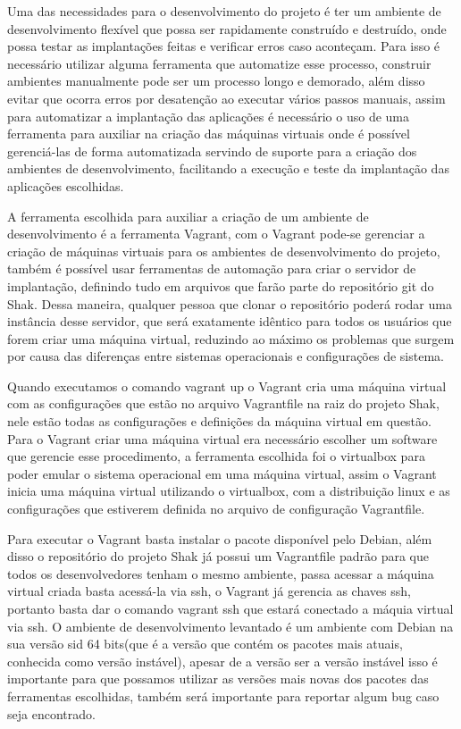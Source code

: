 Uma das necessidades para o desenvolvimento do projeto é ter um ambiente de desenvolvimento
flexível que possa ser rapidamente construído e destruído, onde possa testar as
implantações feitas e verificar erros caso aconteçam. Para isso é necessário utilizar
alguma ferramenta que automatize esse processo, construir ambientes manualmente pode
ser um processo longo e demorado, além disso evitar que ocorra erros por
desatenção ao executar vários passos manuais, assim para automatizar a implantação
das aplicações é necessário o uso de uma ferramenta para auxiliar na criação das
máquinas virtuais onde é possível gerenciá-las de forma automatizada servindo de
suporte para a criação dos ambientes de desenvolvimento, facilitando a execução e teste da implantação das
aplicações escolhidas.

A ferramenta escolhida para auxiliar a criação de um ambiente de desenvolvimento é
a ferramenta Vagrant, com o Vagrant pode-se gerenciar a criação de máquinas
virtuais para os ambientes de desenvolvimento do projeto, também é possível usar
ferramentas de automação para criar o servidor de implantação, definindo tudo
em arquivos que farão parte do repositório git do Shak. Dessa maneira,
qualquer pessoa que clonar o repositório poderá rodar uma instância desse servidor, que será exatamente
idêntico para todos os usuários que forem criar uma máquina virtual, reduzindo ao
máximo os problemas que surgem por causa das diferenças entre sistemas operacionais e configurações de sistema.

Quando executamos o comando vagrant up o Vagrant cria uma máquina virtual com as
configurações que estão no arquivo Vagrantfile na raiz do projeto Shak, nele
estão todas as configurações e definições da máquina virtual em questão. Para o
Vagrant criar uma máquina virtual era necessário escolher um software que gerencie
esse procedimento, a ferramenta escolhida foi o virtualbox para poder emular o sistema
operacional em uma máquina virtual, assim o Vagrant inicia uma máquina virtual
utilizando o virtualbox, com a distribuição linux e as configurações que estiverem
definida no arquivo de configuração Vagrantfile.

Para executar o Vagrant basta instalar o pacote disponível pelo Debian, além disso
o repositório do projeto Shak já possui um Vagrantfile padrão para que todos os
desenvolvedores tenham o mesmo ambiente, passa acessar a máquina virtual criada
basta acessá-la via ssh, o Vagrant já gerencia as chaves ssh, portanto basta
dar o comando vagrant ssh que estará conectado a máquia virtual via ssh.
O ambiente de desenvolvimento levantado é um ambiente com Debian na sua versão
sid 64 bits(que é a versão que contém os pacotes mais atuais, conhecida como versão instável),
apesar de a versão ser a versão instável isso é importante para que possamos
utilizar as versões mais novas dos pacotes das ferramentas escolhidas, também
será importante para reportar algum bug caso seja encontrado.

